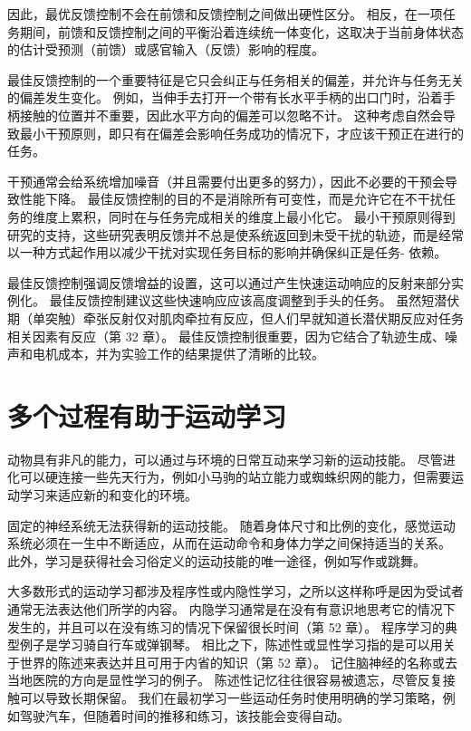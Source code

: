 因此，最优反馈控制不会在前馈和反馈控制之间做出硬性区分。 相反，在一项任务期间，前馈和反馈控制之间的平衡沿着连续统一体变化，这取决于当前身体状态的估计受预测（前馈）或感官输入（反馈）影响的程度。

最佳反馈控制的一个重要特征是它只会纠正与任务相关的偏差，并允许与任务无关的偏差发生变化。 例如，当伸手去打开一个带有长水平手柄的出口门时，沿着手柄接触的位置并不重要，因此水平方向的偏差可以忽略不计。 这种考虑自然会导致最小干预原则，即只有在偏差会影响任务成功的情况下，才应该干预正在进行的任务。

干预通常会给系统增加噪音（并且需要付出更多的努力），因此不必要的干预会导致性能下降。 最佳反馈控制的目的不是消除所有可变性，而是允许它在不干扰任务的维度上累积，同时在与任务完成相关的维度上最小化它。 最小干预原则得到研究的支持，这些研究表明反馈并不总是使系统返回到未受干扰的轨迹，而是经常以一种方式起作用以减少干扰对实现任务目标的影响并确保纠正是任务- 依赖。

最佳反馈控制强调反馈增益的设置，这可以通过产生快速运动响应的反射来部分实例化。 最佳反馈控制建议这些快速响应应该高度调整到手头的任务。 虽然短潜伏期（单突触）牵张反射仅对肌肉牵拉有反应，但人们早就知道长潜伏期反应对任务相关因素有反应（第 32 章）。 最佳反馈控制很重要，因为它结合了轨迹生成、噪声和电机成本，并为实验工作的结果提供了清晰的比较。



\section{多个过程有助于运动学习}
动物具有非凡的能力，可以通过与环境的日常互动来学习新的运动技能。 尽管进化可以硬连接一些先天行为，例如小马驹的站立能力或蜘蛛织网的能力，但需要运动学习来适应新的和变化的环境。

固定的神经系统无法获得新的运动技能。 随着身体尺寸和比例的变化，感觉运动系统必须在一生中不断适应，从而在运动命令和身体力学之间保持适当的关系。 此外，学习是获得社会习俗定义的运动技能的唯一途径，例如写作或跳舞。

大多数形式的运动学习都涉及程序性或内隐性学习，之所以这样称呼是因为受试者通常无法表达他们所学的内容。 内隐学习通常是在没有有意识地思考它的情况下发生的，并且可以在没有练习的情况下保留很长时间（第 52 章）。 程序学习的典型例子是学习骑自行车或弹钢琴。 相比之下，陈述性或显性学习指的是可以用关于世界的陈述来表达并且可用于内省的知识（第 52 章）。 记住脑神经的名称或去当地医院的方向是显性学习的例子。 陈述性记忆往往很容易被遗忘，尽管反复接触可以导致长期保留。 我们在最初学习一些运动任务时使用明确的学习策略，例如驾驶汽车，但随着时间的推移和练习，该技能会变得自动。

